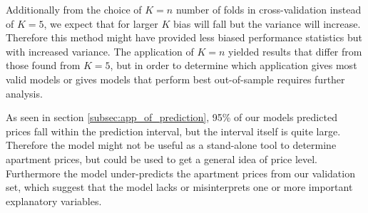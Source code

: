 Additionally from the choice of $K=n$ number of folds in cross-validation instead of $K=5$, we expect that for larger $K$ bias will fall but the variance will increase.
Therefore this method might have provided less biased performance statistics but with increased variance.
The application of $K=n$ yielded results that differ from those found from $K=5$, but in order to determine which application gives most valid models or gives models that perform best out-of-sample requires further analysis. 

As seen in section \ref{subsec:app_of_prediction}, 95\% of our models predicted prices fall within the prediction interval, but the interval itself is quite large.
Therefore the model might not be useful as a stand-alone tool to determine apartment prices, but could be used to get a general idea of price level. 
Furthermore the model under-predicts the apartment prices from our validation set, which suggest that the model lacks or misinterprets one or more important explanatory variables.